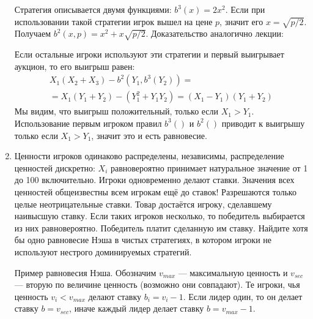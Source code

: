 \begin{enumerate}
Стратегия описывается двумя функциями: $ b^{3}(x)=2x^{2} $. Если при использовании такой стратегии игрок вышел на цене $ p $, значит его $ x=\sqrt{p/2} $. Получаем $ b^{2}(x,p)=x^{2}+x\sqrt{p/2}$. Доказательство аналогично лекции:

Если остальные игроки используют эти стратегии и первый выигрывает аукцион, то его выигрыш равен:
\begin{multline}
X_{1}(X_{2}+X_{3})-b^{2}(Y_{1},b^{3}(Y_{2}))=\\
=X_{1}(Y_{1}+Y_{2})-(Y_{1}^{2}+Y_{1}Y_{2})=(X_{1}-Y_{1})(Y_{1}+Y_{2})
\end{multline}
Мы видим, что выигрыш положительный, только если $ X_{1}>Y_{1} $. Использование первым игроком правил $ b^{3}() $ и $ b^{2}() $ приводит к выигрышу только если $ X_{1}>Y_{1} $, значит это и есть равновесие.


\item Ценности игроков одинаково распределены, независимы, распределение ценностей дискретно: $ X_{i}$ равновероятно принимает натуральное значение от 1 до 100 включительно. Игроки одновременно делают ставки. Значения всех ценностей общеизвестны всем игрокам ещё до ставок! Разрешаются только целые неотрицательные ставки. Товар достаётся игроку, сделавшему наивысшую ставку. Если таких игроков несколько, то победитель выбирается из них равновероятно. Победитель платит сделанную им ставку. Найдите хотя бы одно равновесие Нэша в чистых стратегиях, в котором игроки не используют нестрого доминируемых стратегий.


Пример равновесия Нэша. Обозначим $ v_{max} $ — максимальную ценность и $ v_{sec} $ — вторую по величине ценность (возможно они совпадают). Те игроки, чья ценность $ v_{i}<v_{max} $ делают ставку $ b_{i}=v_{i}-1 $. Если лидер один, то он делает ставку $ b=v_{sec} $, иначе каждый лидер делает ставку $ b=v_{max}-1 $.


\end{enumerate}
